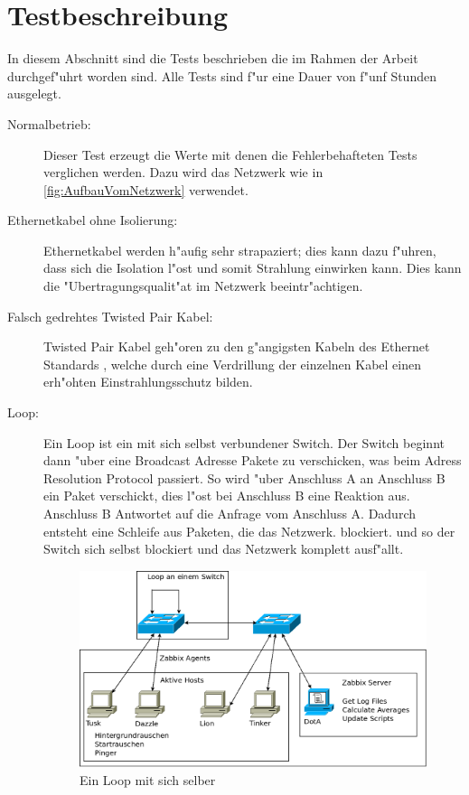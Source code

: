 \section{Testbeschreibung}
\label{sec:testbeschreibung}
In diesem Abschnitt sind die Tests beschrieben die im Rahmen der Arbeit durchgef"uhrt worden sind. %
Alle Tests sind f"ur eine Dauer von f"unf Stunden ausgelegt.  %
\begin{description}
\item[Normalbetrieb:]Dieser Test erzeugt die Werte mit denen die Fehlerbehafteten %
Tests verglichen werden. Dazu wird das Netzwerk wie in \cref{fig:AufbauVomNetzwerk} %
verwendet. 
\item[Ethernetkabel ohne Isolierung:]Ethernetkabel werden h"aufig sehr strapaziert;%
dies kann dazu f"uhren, dass sich die Isolation l"ost und somit Strahlung einwirken kann. %
Dies kann die "Ubertragungsqualit"at im Netzwerk beeintr"achtigen. 
\item[Falsch gedrehtes Twisted Pair Kabel:]Twisted Pair Kabel geh"oren zu den g"angigsten %
Kabeln des Ethernet Standards \autocite{book:CN2003}, welche durch eine Verdrillung der einzelnen Kabel %
einen erh"ohten Einstrahlungsschutz bilden. %
\item[Loop:]Ein Loop ist ein mit sich selbst verbundener Switch. Der Switch beginnt %
dann "uber eine Broadcast Adresse Pakete zu verschicken, was beim Adress Resolution Protocol passiert. %
So wird "uber Anschluss A an Anschluss B ein Paket verschickt, dies l"ost bei Anschluss B eine Reaktion aus.
Anschluss B Antwortet auf die Anfrage vom Anschluss A. Dadurch entsteht eine Schleife aus Paketen, die das Netzwerk. %
blockiert. %
und so der Switch sich selbst blockiert und das Netzwerk komplett ausf"allt. %
\begin{figure}[htbp]
\centering
\includegraphics*[width=0.9\linewidth]{Abb/Versuche/Loop1Switch}
\caption{Ein Loop mit sich selber}

\end{figure}
\end{description}
